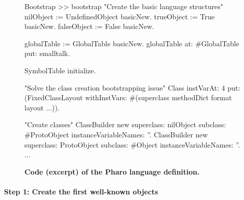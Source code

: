 \begin{figure}[ht]
\begin{code}
Bootstrap >> bootstrap
    "Create the basic language structures"
    nilObject := UndefinedObject basicNew.
    trueObject := True basicNew.
    falseObject := False basicNew.
    
    globalTable := GlobalTable basicNew.
    globalTable at: #GlobalTable put: smalltalk.
    
    SymbolTable initialize.
    
    "Solve the class creation bootstrapping issue"
    Class
        instVarAt: 4
        put: (FixedClassLayout
            withInstVars: #(superclass methodDict format layout ...)).
    
    "Create classes"
    ClassBuilder new
        superclass: nilObject
        subclass: #ProtoObject
        instanceVariableNames: ''.
    ClassBuilder new
        superclass: ProtoObject
        subclass: #Object
        instanceVariableNames: ''.
    ...
\end{code}
\caption{\textbf{Code (excerpt) of the Pharo language definition.}\label{code:process}}
\end{figure}



%

\paragraph{\textbf{Step 1: Create the first well-known objects}}\label{sec:create_nil}

